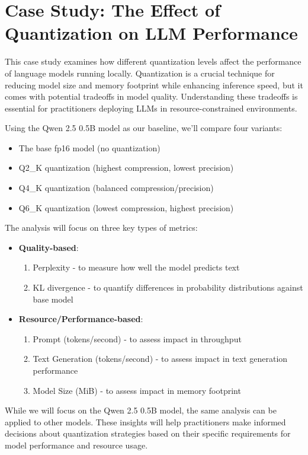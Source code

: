 \section{Case Study: The Effect of Quantization on LLM Performance}

This case study examines how different quantization  levels affect the performance of language models running locally. Quantization is a crucial technique for reducing model size and memory footprint while enhancing inference speed, but it comes with potential tradeoffs in model quality. Understanding these tradeoffs is essential for practitioners deploying LLMs in resource-constrained environments.

Using the Qwen 2.5 0.5B model as our baseline, we'll compare four variants:
\begin{itemize}
\item The base fp16 model (no quantization)
\item Q2\_K quantization (highest compression, lowest precision)
\item Q4\_K quantization (balanced compression/precision)
\item Q6\_K quantization (lowest compression, highest precision)
\end{itemize}

The analysis will focus on three key types of metrics:
\begin{itemize}
\item \textbf{Quality-based}:
  \begin{enumerate}
  \item Perplexity - to measure how well the model predicts text
  \item KL divergence - to quantify differences in probability distributions against base model
  \end{enumerate}
\item \textbf{Resource/Performance-based}:
  \begin{enumerate}
  \item Prompt (tokens/second) - to assess impact in throughput
  \item Text Generation (tokens/second) - to assess impact in text generation performance
  \item Model Size (MiB) - to assess impact in memory footprint
  \end{enumerate}
\end{itemize}

While we will focus on the Qwen 2.5 0.5B model, the same analysis can be applied to other models. These insights will help practitioners make informed decisions about quantization strategies based on their specific requirements for model performance and resource usage.


